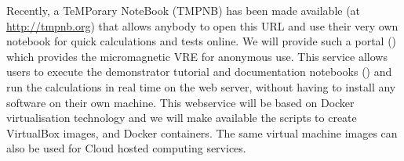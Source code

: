 \begin{workpackage}
\begin{tasklist}
\begin{task}[title=Visualization system for 3d data in web-notebook
,id=vis3d,lead=SR, partners={US,PS,USO}]
\begin{task}[lead=USO,title=Demonstrator: micromagnetic VRE notebooks,
  id=oommf-tutorial-and-documentation, PM=6, partners={SR,PS}]

\end{task}

\begin{task}[lead=USO,id=oommf-nb-ve,title=Online portal for
  micromagnetic VRE demonstrator,PM=3, partners={SR,JU}]

  Recently, a TeMPorary \Jupyter NoteBook (TMPNB) has been made
  available (at \href{http://tmpnb.org}{http://tmpnb.org}) that allows
  anybody to open this URL and use their very own \Jupyter notebook
  for quick calculations and tests online. We will provide such a
  portal () which provides the micromagnetic VRE for anonymous use. This
  service allows users to execute the demonstrator tutorial and
  documentation notebooks
  () and run the
  calculations in real time on the web server, without having to
  install any software on their own machine.  This webservice will be
  based on Docker \cite{Docker} virtualisation technology and we will
  make available the scripts to create VirtualBox \cite{Virtualbox}
  images, and Docker containers. The same virtual machine images can
  also be used for Cloud hosted computing services.


\end{task}
\end{task}
\end{tasklist}
\end{workpackage}
